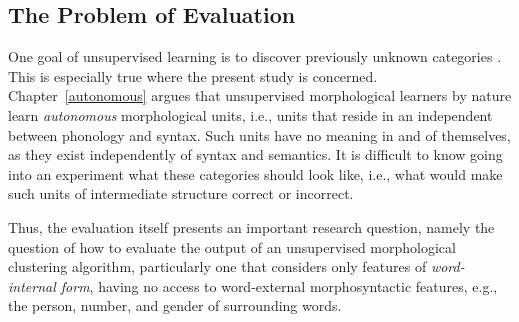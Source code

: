 
\subsection{The Problem of Evaluation}  One goal of unsupervised learning is to discover previously unknown categories \citep{parsons:2004}. This is especially true where the present study is concerned. Chapter~\ref{autonomous} argues that unsupervised morphological learners by nature learn \emph{autonomous} morphological units, i.e., units that reside in an independent between phonology and syntax. Such units have no meaning in and of themselves, as they exist independently of syntax and semantics. It is difficult to know going into an experiment what these categories should look like, i.e., what would make such units of intermediate structure correct or incorrect. 

%

Thus, the evaluation itself presents an important research question, namely the question of how to evaluate the output of an unsupervised morphological clustering algorithm, particularly one that considers only features of \emph{word-internal form}, having no access to word-external morphosyntactic features, e.g., the person, number, and gender of surrounding words. 


